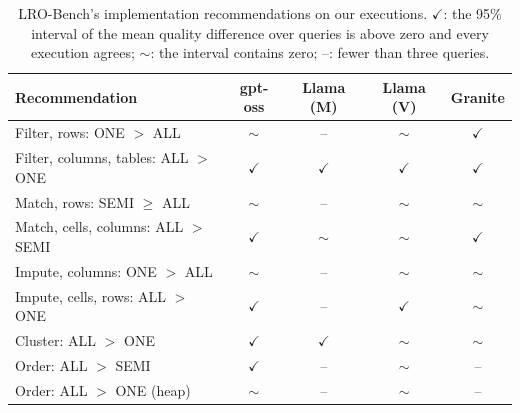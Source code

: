 \begin{table}[t]
\caption{LRO-Bench's implementation recommendations on our executions. $\checkmark$: the 95\% interval of the mean quality difference over queries is above zero and every execution agrees; $\sim$: the interval contains zero; --: fewer than three queries.}
\label{tab:claims}
\scriptsize
\setlength{\tabcolsep}{2.5pt}
\begin{tabular*}{\linewidth}{@{\extracolsep{\fill}}lcccc@{}}
\toprule
Recommendation & gpt-oss & Llama (M) & Llama (V) & Granite \\
\midrule
Filter, rows: ONE $>$ ALL & $\sim$ & -- & $\sim$ & $\checkmark$ \\
Filter, columns, tables: ALL $>$ ONE & $\checkmark$ & $\checkmark$ & $\checkmark$ & $\checkmark$ \\
Match, rows: SEMI $\geq$ ALL & $\sim$ & -- & $\sim$ & $\sim$ \\
Match, cells, columns: ALL $>$ SEMI & $\checkmark$ & $\sim$ & $\sim$ & $\checkmark$ \\
Impute, columns: ONE $>$ ALL & $\sim$ & -- & $\sim$ & $\sim$ \\
Impute, cells, rows: ALL $>$ ONE & $\checkmark$ & -- & $\checkmark$ & $\sim$ \\
Cluster: ALL $>$ ONE & $\checkmark$ & $\checkmark$ & $\sim$ & $\sim$ \\
Order: ALL $>$ SEMI & $\checkmark$ & -- & $\sim$ & -- \\
Order: ALL $>$ ONE (heap) & $\sim$ & -- & $\sim$ & -- \\
\bottomrule
\end{tabular*}
\end{table}
